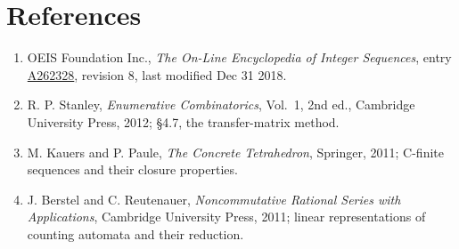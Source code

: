 \documentclass[11pt]{article}
\theoremstyle{definition}
\begin{document}
\section{References}

\begin{enumerate}

\item OEIS Foundation Inc., \emph{The On-Line Encyclopedia of Integer Sequences}, entry \href{https://oeis.org/A262328}{A262328}, revision 8, last modified Dec 31 2018.

\item R. P. Stanley, \emph{Enumerative Combinatorics}, Vol.~1, 2nd ed., Cambridge University Press, 2012; \S4.7, the transfer-matrix method.

\item M. Kauers and P. Paule, \emph{The Concrete Tetrahedron}, Springer, 2011; C-finite sequences and their closure properties.

\item J. Berstel and C. Reutenauer, \emph{Noncommutative Rational Series with Applications}, Cambridge University Press, 2011; linear representations of counting automata and their reduction.

\end{enumerate}
\end{document}
